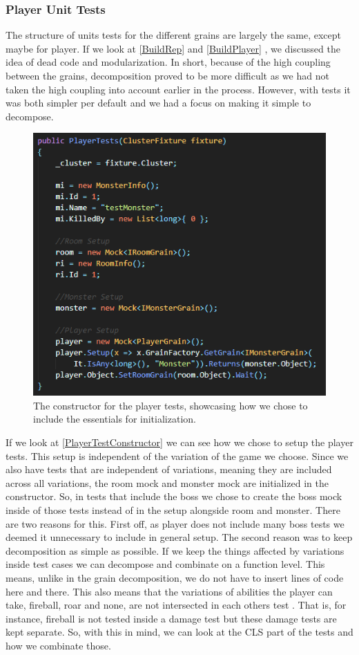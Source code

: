 \subsubsection{Player Unit Tests}
The structure of units tests for the different grains are largely the same, except maybe for player. If we look at \autoref{BuildRep} and \autoref{BuildPlayer} , we discussed the idea of dead code and modularization. In short, because of the high coupling between the grains, decomposition proved to be more difficult as we had not taken the high coupling into account earlier in the process. However, with tests it was both simpler per default and we had a focus on making it simple to decompose. \\
\begin{figure}[h]
    \centering
    \includegraphics[width=0.7\linewidth]{Materials/TestingDiscussion/PlayerTestConstructor}
    \caption{The constructor for the player tests, showcasing how we chose to include the essentials for initialization.}
    \label{PlayerTestConstructor}
\end{figure}
If we look at \autoref{PlayerTestConstructor} we can see how we chose to setup the player tests. This setup is independent of the variation of the game we choose. Since we also have tests that are independent of variations, meaning they are included across all variations, the room mock and monster mock are initialized in the constructor. So, in tests that include the boss we chose to create the boss mock inside of those tests instead of in the setup alongside room and monster. There are two reasons for this. First off, as player does not include many boss tests we deemed it unnecessary to include in general setup. The second reason was to keep decomposition as simple as possible. If we keep the things affected by variations inside test cases we can decompose and combinate on a function level. This means, unlike in the grain decomposition, we do not have to insert lines of code here and there. This also means that the variations of abilities the player can take, fireball, roar and none, are not intersected in each others test . That is, for instance, fireball is not tested inside a damage test but these damage tests are kept separate. So, with this in mind, we can look at the CLS part of the tests and how we combinate those. \\
